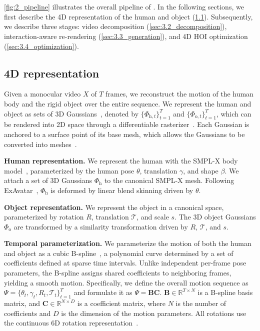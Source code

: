 \section{\ourmethod}
\label{sec:proposed_method}
\cref{fig:2_pipeline} illustrates the overall pipeline of \ourmethod.
In the following sections, we first describe the 4D representation of the human and object (\cref{sec:3.1_representation}).
Subsequently, we describe three stages: video decomposition (\cref{sec:3.2_decomposition}), interaction-aware re-rendering (\cref{sec:3.3_generation}), and 4D HOI optimization (\cref{sec:3.4_optimization}).


\subsection{4D representation}
\label{sec:3.1_representation}
Given a monocular video $X$ of $T$ frames, we reconstruct the motion of the human body and the rigid object over the entire sequence.
We represent the human and object as sets of 3D Gaussians~\cite{kerbl3Dgaussians}, denoted by $\{\Phi_{\text{h},t}\}_{t=1}^{T}$ and $\{\Phi_{\text{o},t}\}_{t=1}^{T}$, which can be rendered into 2D space through a differentiable rasterizer~\cite{yu2024mip}.
Each Gaussian is anchored to a surface point of its base mesh, which allows the Gaussians to be converted into meshes~\cite{nam2026tehor}.


\noindent\textbf{Human representation.}
We represent the human with the SMPL-X body model~\cite{pavlakos2019expressive}, parameterized by the human pose $\theta$, translation $\gamma$, and shape $\beta$.
We attach a set of 3D Gaussians $\Phi_{\text{h}}$ to the canonical SMPL-X mesh.
Following ExAvatar~\cite{moon2024expressive}, $\Phi_{\text{h}}$ is deformed by linear blend skinning driven by $\theta$.


\noindent\textbf{Object representation.}
We represent the object in a canonical space, parameterized by rotation $R$, translation $\mathcal{T}$, and scale $s$.
The 3D object Gaussians $\Phi_{\text{o}}$ are transformed by a similarity transformation driven by $R$, $\mathcal{T}$, and $s$.


\noindent\textbf{Temporal parameterization.}
We parameterize the motion of both the human and object as a cubic B-spline~\cite{de1978practical}, a polynomial curve determined by a set of coefficients defined at sparse time intervals.
Unlike independent per-frame pose parameters, the B-spline assigns shared coefficients to neighboring frames, yielding a smooth motion.
Specifically, we define the overall motion sequence as $\Psi=\{\theta_t,\gamma_t,R_t,\mathcal{T}_t\}_{t=1}^{T}$ and formulate it as $\Psi = \mathbf{B}\mathbf{C}$.
$\mathbf{B}\in\mathbb{R}^{T\times N}$ is a B-spline basis matrix, and $\mathbf{C}\in\mathbb{R}^{N\times D}$ is a coefficient matrix, where $N$ is the number of coefficients and $D$ is the dimension of the motion parameters.
All rotations use the continuous 6D rotation representation~\cite{zhou2019continuity}.


